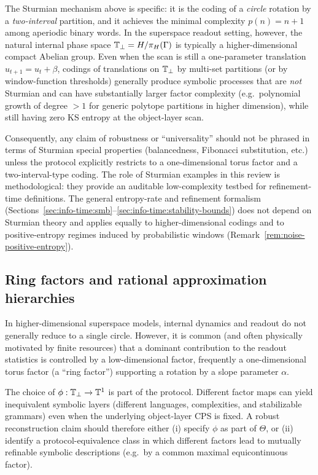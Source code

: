 \begin{remark}\label{rem:beyond-sturmian}
The Sturmian mechanism above is specific: it is the coding of a \emph{circle} rotation by a \emph{two-interval} partition, and it achieves the minimal complexity $p(n)=n+1$ among aperiodic binary words. In the superspace readout setting, however, the natural internal phase space $\mathbb{T}_\perp=H/\pi_H(\Gamma)$ is typically a higher-dimensional compact Abelian group. Even when the scan is still a one-parameter translation $u_{t+1}=u_t+\beta$, codings of translations on $\mathbb{T}_\perp$ by multi-set partitions (or by window-function thresholds) generally produce symbolic processes that are \emph{not} Sturmian and can have substantially larger factor complexity (e.g.\ polynomial growth of degree $>1$ for generic polytope partitions in higher dimension), while still having zero KS entropy at the object-layer scan.

Consequently, any claim of robustness or ``universality'' should not be phrased in terms of Sturmian special properties (balancedness, Fibonacci substitution, etc.) unless the protocol explicitly restricts to a one-dimensional torus factor and a two-interval-type coding. The role of Sturmian examples in this review is methodological: they provide an auditable low-complexity testbed for refinement-time definitions. The general entropy-rate and refinement formalism (Sections~\ref{sec:info-time:smb}--\ref{sec:info-time:stability-bounds}) does not depend on Sturmian theory and applies equally to higher-dimensional codings and to positive-entropy regimes induced by probabilistic windows (Remark~\ref{rem:noise-positive-entropy}).
\end{remark}

\subsection{Ring factors and rational approximation hierarchies}\label{sec:readout:ring-factor}

In higher-dimensional superspace models, internal dynamics and readout do not generally reduce to a single circle. However, it is common (and often physically motivated by finite resources) that a dominant contribution to the readout statistics is controlled by a low-dimensional factor, frequently a one-dimensional torus factor (a ``ring factor'') supporting a rotation by a slope parameter $\alpha$.

\begin{remark}\label{rem:ring-factor-sensitivity}
The choice of $\phi:\mathbb{T}_\perp\to\mathbb{T}^1$ is part of the protocol. Different factor maps can yield inequivalent symbolic layers (different languages, complexities, and stabilizable grammars) even when the underlying object-layer CPS is fixed. A robust reconstruction claim should therefore either (i) specify $\phi$ as part of $\Theta$, or (ii) identify a protocol-equivalence class in which different factors lead to mutually refinable symbolic descriptions (e.g.\ by a common maximal equicontinuous factor).
\end{remark}

